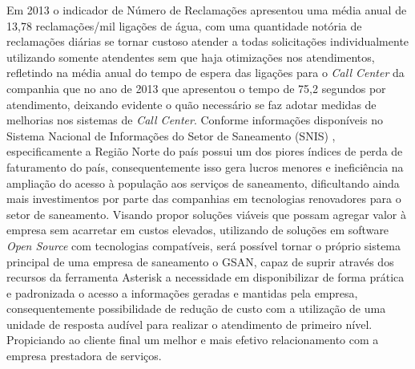  Em 2013 o indicador de Número de Reclamações apresentou uma média anual de 13,78 reclamações/mil ligações de água, com uma quantidade notória de reclamações diárias se tornar custoso atender a todas solicitações individualmente utilizando somente atendentes sem que haja otimizações nos atendimentos, refletindo na média anual do tempo de espera das ligações para o \textit{Call Center} da companhia que no ano de 2013 que apresentou o tempo de 75,2 segundos por atendimento, deixando evidente o quão necessário se faz adotar medidas de melhorias nos sistemas de \textit{Call Center}. Conforme informações disponíveis no Sistema Nacional de Informações do Setor de Saneamento (SNIS) \cite{SNIS:2014}, especificamente a Região Norte do país possui um dos piores índices de perda de faturamento do país, consequentemente isso gera lucros menores e ineficiência na ampliação do acesso à população aos serviços de saneamento, dificultando ainda mais investimentos por parte das companhias em tecnologias renovadores para o setor de saneamento. Visando propor soluções viáveis que possam agregar valor à empresa sem acarretar em custos elevados, utilizando de soluções em software \textit{Open Source} com tecnologias compatíveis, será possível tornar o próprio sistema principal de uma empresa de saneamento o GSAN, capaz de suprir através dos recursos da ferramenta Asterisk a necessidade em disponibilizar de forma prática e padronizada o acesso a informações geradas e mantidas pela empresa, consequentemente possibilidade de redução de custo com a utilização de uma unidade de resposta audível para realizar o atendimento de primeiro nível. Propiciando ao cliente final um melhor e mais efetivo relacionamento com a empresa prestadora de serviços.

